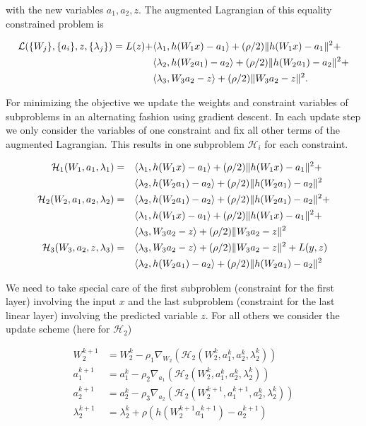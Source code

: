 \documentclass[english,11pt,a4paper]{article}
\begin{document}
with the new variables $a_1, a_2, z$. The augmented Lagrangian of this equality constrained problem is

\begin{equation}
	\begin{aligned}
		\mathcal{L}(\{W_j\}, \{a_i\}, z, \{\lambda_j\}) = L(z) + 
		& \langle \lambda_1, h(W_1x)-a_1 \rangle + (\rho/2) \| h(W_1x)-a_1 \|^2 + \\
		& \langle \lambda_2, h(W_2a_1)-a_2 \rangle + (\rho/2) \| h(W_2a_1)-a_2 \|^2 + \\
		& \langle \lambda_3, W_3a_2-z \rangle + (\rho/2) \| W_3a_2-z \|^2.
	\end{aligned}
\end{equation}

For minimizing the objective we update the weights and constraint variables of subproblems in an alternating fashion using gradient descent. In each update step we only consider the variables of one constraint and fix all other terms of the augmented Lagrangian. This results in one subproblem $\mathcal{H}_i$ for each constraint.

\begin{equation}
	\begin{aligned}
		\mathcal{H}_1(W_1,a_1,\lambda_1) &= && \langle \lambda_1, h(W_1x)-a_1 \rangle + (\rho/2) \| h(W_1x)-a_1 \|^2 + \\
		& && \langle \lambda_2, h(W_2a_1)-a_2 \rangle + (\rho/2) \| h(W_2a_1)-a_2 \|^2 \\
		\mathcal{H}_2(W_2,a_1,a_2,\lambda_2) &= && \langle \lambda_2, h(W_2a_1)-a_2 \rangle + (\rho/2) \| h(W_2a_1)-a_2 \|^2 + \\
		& && \langle \lambda_1, h(W_1x)-a_1 \rangle + (\rho/2) \| h(W_1x)-a_1 \|^2 + \\
		& && \langle \lambda_3, W_3a_2-z \rangle + (\rho/2) \| W_3a_2-z \|^2 \\
		\mathcal{H}_3(W_3,a_2,z,\lambda_3) &= && \langle \lambda_3, W_3a_2-z \rangle + (\rho/2) \| W_3a_2-z \|^2 + L(y,z) \\
		& && \langle \lambda_2, h(W_2a_1)-a_2 \rangle + (\rho/2) \| h(W_2a_1)-a_2 \|^2
	\end{aligned}
\end{equation}

We need to take special care of the first subproblem (constraint for the first layer) involving the input $x$ and the last subproblem (constraint for the last linear layer) involving the predicted variable $z$. For all others we consider the update scheme (here for $\mathcal{H}_2$)

\begin{equation}
	\begin{aligned}
		W_2^{k+1} &= W_2^k - \rho_1 \nabla_{W_2}(\mathcal{H}_2(W_2^k,a_1^k,a_2^k,\lambda_2^k)) \\
		a_1^{k+1} &= a_1^k - \rho_2 \nabla_{a_1}(\mathcal{H}_2(W_2^k,a_1^k,a_2^k,\lambda_2^k)) \\
		a_2^{k+1} &= a_2^k - \rho_3 \nabla_{a_2}(\mathcal{H}_2(W_2^{k+1},a_1^{k+1},a_2^k,\lambda_2^k)) \\
		\lambda_2^{k+1} &= \lambda_2^{k} + \rho (h(W_2^{k+1}a_1^{k+1})-a_2^{k+1})
	\end{aligned}
\end{equation}
\end{document}
